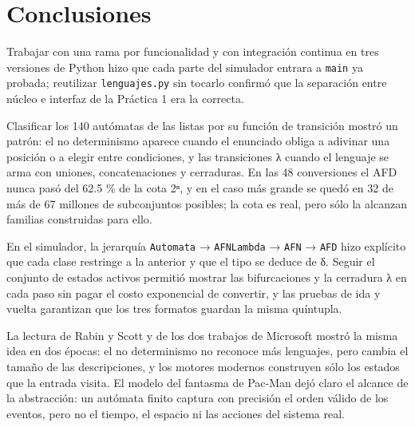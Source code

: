\hypertarget{conclusiones}{%
\section{Conclusiones}\label{conclusiones}}

Trabajar con una rama por funcionalidad y con integración continua en tres versiones de Python hizo que cada parte del simulador entrara a \texttt{main} ya probada; reutilizar \texttt{lenguajes.py} sin tocarlo confirmó que la separación entre núcleo e interfaz de la Práctica 1 era la correcta.

Clasificar los 140 autómatas de las listas por su función de transición mostró un patrón: el no determinismo aparece cuando el enunciado obliga a adivinar una posición o a elegir entre condiciones, y las transiciones λ cuando el lenguaje se arma con uniones, concatenaciones y cerraduras. En las 48 conversiones el AFD nunca pasó del 62.5 \% de la cota 2ⁿ, y en el caso más grande se quedó en 32 de más de 67 millones de subconjuntos posibles; la cota es real, pero sólo la alcanzan familias construidas para ello.

En el simulador, la jerarquía \texttt{Automata} → \texttt{AFNLambda} → \texttt{AFN} → \texttt{AFD} hizo explícito que cada clase restringe a la anterior y que el tipo se deduce de δ. Seguir el conjunto de estados activos permitió mostrar las bifurcaciones y la cerradura λ en cada paso sin pagar el costo exponencial de convertir, y las pruebas de ida y vuelta garantizan que los tres formatos guardan la misma quíntupla.

La lectura de Rabin y Scott y de los dos trabajos de Microsoft mostró la misma idea en dos épocas: el no determinismo no reconoce más lenguajes, pero cambia el tamaño de las descripciones, y los motores modernos construyen sólo los estados que la entrada visita. El modelo del fantasma de Pac-Man dejó claro el alcance de la abstracción: un autómata finito captura con precisión el orden válido de los eventos, pero no el tiempo, el espacio ni las acciones del sistema real.

